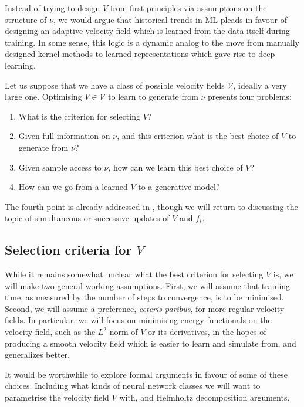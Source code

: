 \documentclass[twoside,10pt]{../jmlr}
\begin{document}
Instead of trying to design $V$ from first principles via assumptions on the structure of $\nu$, we would argue that historical trends in ML pleads in favour of designing an adaptive velocity field which is learned from the data itself during training. In some sense, this logic is a dynamic analog to the move from manually designed kernel methods to learned representations which gave rise to deep learning. 

Let us suppose that we have a class of possible velocity fields $\mathcal V$, ideally a very large one. Optimising $V\in\mathcal V$ to learn to generate from $\nu$ presents four problems:
\begin{enumerate}
    \item What is the criterion for selecting $V$? 
    \item Given full information on $\nu$, and this criterion what is the best choice of $V$ to generate from $\nu$? 
    \item Given sample access to $\nu$, how can we learn this best choice of $V$?
    \item How can we go from a learned $V$ to a generative model?
\end{enumerate} 
The fourth point is already addressed in \cite{deng2026generative}, though we will return to discussing the topic of simultaneous or successive updates of $V$ and $f_t$. 

\subsection{Selection criteria for $V$}

While it remains somewhat unclear what the best criterion for selecting $V$ is, we will make two general working assumptions. First, we will assume that training time, as measured by the number of steps to convergence, is to be minimised. Second, we will assume a preference, \emph{ceteris paribus}, for more regular velocity fields. In particular, we will focus on minimising energy functionals on the velocity field, such as the $L^2$ norm of $V$ or its derivatives, in the hopes of producing a smooth velocity field which is easier to learn and simulate from, and generalizes better.

It would be worthwhile to explore formal arguments in favour of some of these choices. Including what kinds of neural network classes we will want to parametrise the velocity field $V$ with, and Helmholtz decomposition arguments. 
\end{document}

